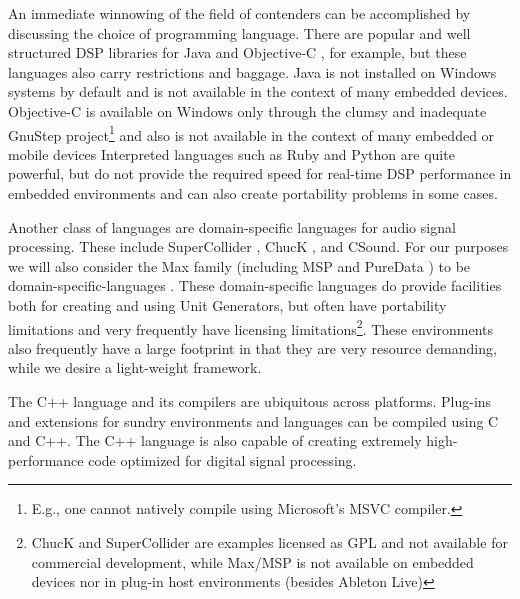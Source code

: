 \documentclass[twoside,10pt]{article}
\begin{document}
An immediate winnowing of the field of contenders can be accomplished by discussing the choice of programming language.  There are popular and well structured DSP libraries for Java \cite{Guillemard:2005, Burk:1998} and Objective-C \cite{Jaffe:1989,Jaffe:1991}, for example, but these languages also carry restrictions and baggage.  Java is not installed on Windows systems by default and is not available in the context of many embedded devices.  Objective-C is available on Windows only through the clumsy and inadequate GnuStep project\footnote{E.g., one cannot natively compile using Microsoft's MSVC compiler.} \cite{web3} and also is not available in the context of many embedded or mobile devices
Interpreted languages such as Ruby and Python are quite powerful, but do not provide the required speed for real-time DSP performance in embedded environments and can also create portability problems in some cases. 

Another class of languages are domain-specific languages for audio signal processing.  These include SuperCollider \cite{McCartney:1996}, ChucK \cite{wang:2008}, and CSound.  For our purposes we will also consider the Max family (including MSP \cite{Zicarelli:1998} and PureData \cite{Puckette:1996}) to be domain-specific-languages
.  
These domain-specific languages do provide facilities both for creating and using Unit Generators, but often have portability limitations and very frequently have licensing limitations\footnote{ChucK and SuperCollider are examples licensed as GPL and not available for commercial development, while Max/MSP is not available on embedded devices nor in plug-in host environments (besides Ableton Live)}.  These environments also frequently have a large footprint in that they are very resource demanding, while we desire a light-weight framework.

The C++ language and its compilers are ubiquitous across platforms.  Plug-ins and extensions for sundry environments and languages can be compiled using C and C++.  The C++ language is also capable of creating extremely high-performance code optimized for digital signal processing.
\end{document}
